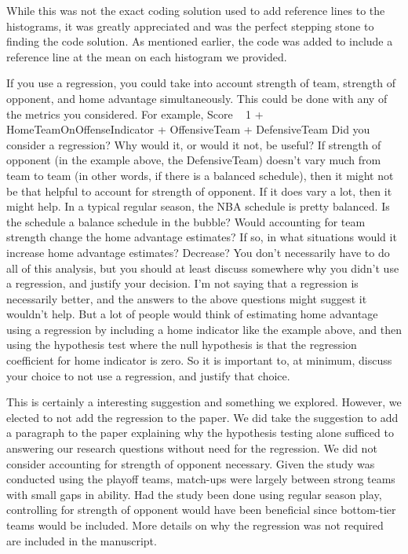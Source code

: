 \documentclass[12pt]{article}
\newenvironment{comment}%
{\begin{quoting}\noindent\small\it\ignorespaces%
  }{\end{quoting}}
\begin{document}
 While this was not the exact coding solution used to add reference lines to the histograms, it was greatly appreciated and was the perfect stepping stone to finding the code solution. As mentioned earlier, the code was added to include a reference line at the mean on each histogram we provided.

 
\begin{comment}
If you use a regression, you could take into account strength of team, strength of opponent, and home
advantage simultaneously. This could be done with any of the metrics you considered. For example,
Score ~ 1 + HomeTeamOnOffenseIndicator + OffensiveTeam + DefensiveTeam
Did you consider a regression? Why would it, or would it not, be useful? If strength of opponent (in the
example above, the DefensiveTeam) doesn’t vary much from team to team (in other words, if there is a
balanced schedule), then it might not be that helpful to account for strength of opponent. If it does vary a
lot, then it might help.
In a typical regular season, the NBA schedule is pretty balanced. Is the schedule a balance schedule in the
bubble?
Would accounting for team strength change the home advantage estimates? If so, in what situations would
it increase home advantage estimates? Decrease?
You don’t necessarily have to do all of this analysis, but you should at least discuss somewhere why you
didn’t use a regression, and justify your decision. I’m not saying that a regression is necessarily better,
and the answers to the above questions might suggest it wouldn’t help. But a lot of people would think of
estimating home advantage using a regression by including a home indicator like the example above, and
then using the hypothesis test where the null hypothesis is that the regression coefficient for home indicator
is zero. So it is important to, at minimum, discuss your choice to not use a regression, and justify that
choice.
\end{comment}

 This is certainly a interesting suggestion and something we explored. However, we elected to not add the regression to the paper. We did take the suggestion to add a paragraph to the paper explaining why the hypothesis testing alone sufficed to answering our research questions without need for the regression. We did not consider accounting for strength of opponent necessary. Given the study was conducted using the playoff teams, match-ups were largely between strong teams with small gaps in ability. Had the study been done using regular season play, controlling for strength of opponent would have been beneficial since bottom-tier teams would be included. More details on why the regression was not required are included in the manuscript.
\end{document}
